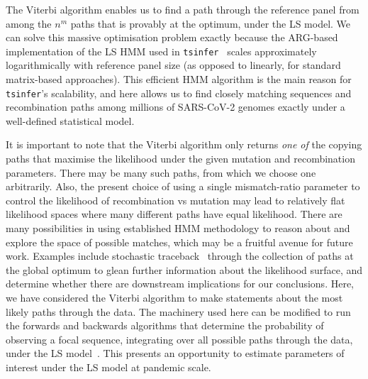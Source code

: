 \documentclass{article}
\begin{document}
The Viterbi algorithm enables us to find a path through
the reference panel from among the $n^m$ paths that is provably at the
optimum, under the LS model.
We can solve this massive optimisation problem exactly because the ARG-based
implementation of the LS HMM used in \texttt{tsinfer}~\citep{Kelleher2019-ba}
scales approximately
logarithmically with reference panel size (as opposed to linearly,
for standard matrix-based approaches).
This efficient HMM algorithm is the main reason for \texttt{tsinfer}'s
scalability, and here allows us to find closely matching
sequences and recombination paths among millions of SARS-CoV-2
genomes exactly under a well-defined statistical model.

It is important to note that the Viterbi algorithm only returns \emph{one of}
the copying paths that maximise the likelihood under the given mutation and
recombination parameters. There may be many such paths, from which we choose
one arbitrarily. Also, the present choice of using a single mismatch-ratio
parameter to control the likelihood of recombination vs mutation may lead to
relatively flat likelihood spaces where many different paths have equal
likelihood.
There are many possibilities in using established HMM methodology
to reason about and explore the space of possible matches, which may be a
fruitful avenue for future work.
Examples include stochastic traceback~\citep[e.g.,][]{rasmussen2014genome}
through the collection of paths at the global optimum to glean further
information about the likelihood surface, and determine whether there are
downstream implications for our conclusions. Here, we have considered the
Viterbi algorithm to make statements about the most likely paths through the
data. The machinery used here can be modified to run the forwards and backwards
algorithms that determine the probability of observing a focal sequence,
integrating over all possible paths through the data, under the LS
model~\citep{Palmer2023-efficient}.
This presents an opportunity to estimate parameters of interest
under the LS model at pandemic scale.
\end{document}
